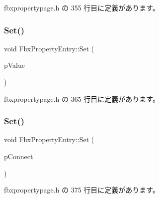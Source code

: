  fbxpropertypage.\+h の 355 行目に定義があります。

\mbox{\label{class_fbx_property_entry_a2b8e9b06392c64c7ad2279f0cd22b26a}} 
\subsubsection{\texorpdfstring{Set()}{Set()}\hspace{0.1cm}{\footnotesize\ttfamily [2/5]}}
{\footnotesize\ttfamily void Fbx\+Property\+Entry\+::\+Set (\begin{DoxyParamCaption}\item[{\hyperlink{class_fbx_property_value}{Fbx\+Property\+Value} $\ast$}]{p\+Value }\end{DoxyParamCaption})\hspace{0.3cm}{\ttfamily [inline]}}



 fbxpropertypage.\+h の 365 行目に定義があります。

\mbox{\label{class_fbx_property_entry_a454ced1ebe45eb69c62b9618a6c6f5e3}} 
\subsubsection{\texorpdfstring{Set()}{Set()}\hspace{0.1cm}{\footnotesize\ttfamily [3/5]}}
{\footnotesize\ttfamily void Fbx\+Property\+Entry\+::\+Set (\begin{DoxyParamCaption}\item[{\hyperlink{class_fbx_property_connect}{Fbx\+Property\+Connect} $\ast$}]{p\+Connect }\end{DoxyParamCaption})\hspace{0.3cm}{\ttfamily [inline]}}



 fbxpropertypage.\+h の 375 行目に定義があります。

\mbox{\label{class_fbx_property_entry_a34f5e6c4048ed0519f6a74db1f341b2e}} 
